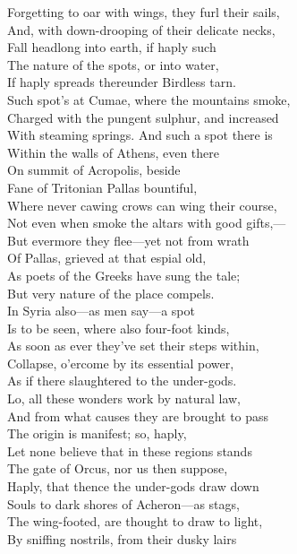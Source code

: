 Forgetting to oar with wings, they furl their sails,\\
And, with down-drooping of their delicate necks,\\
Fall headlong into earth, if haply such\\
The nature of the spots, or into water,\\
If haply spreads thereunder Birdless tarn.\\
Such spot's at Cumae, where the mountains smoke,\\
Charged with the pungent sulphur, and increased\\
With steaming springs. And such a spot there is\\
Within the walls of Athens, even there\\
On summit of Acropolis, beside\\
Fane of Tritonian Pallas bountiful,\\
Where never cawing crows can wing their course,\\
Not even when smoke the altars with good gifts,—\\
But evermore they flee—yet not from wrath\\
Of Pallas, grieved at that espial old,\\
As poets of the Greeks have sung the tale;\\
But very nature of the place compels.\\
In Syria also—as men say—a spot\\
Is to be seen, where also four-foot kinds,\\
As soon as ever they've set their steps within,\\
Collapse, o'ercome by its essential power,\\
As if there slaughtered to the under-gods.\\
Lo, all these wonders work by natural law,\\
And from what causes they are brought to pass\\
The origin is manifest; so, haply,\\
Let none believe that in these regions stands\\
The gate of Orcus, nor us then suppose,\\
Haply, that thence the under-gods draw down\\
Souls to dark shores of Acheron—as stags,\\
The wing-footed, are thought to draw to light,\\
By sniffing nostrils, from their dusky lairs\\
